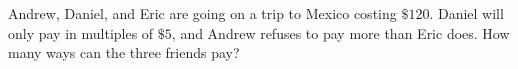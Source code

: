 Andrew, Daniel, and Eric are going on a trip to Mexico costing $\$120$. Daniel will only pay in multiples of $\$5$, and Andrew refuses to pay more than Eric does. How many ways can the three friends pay?
